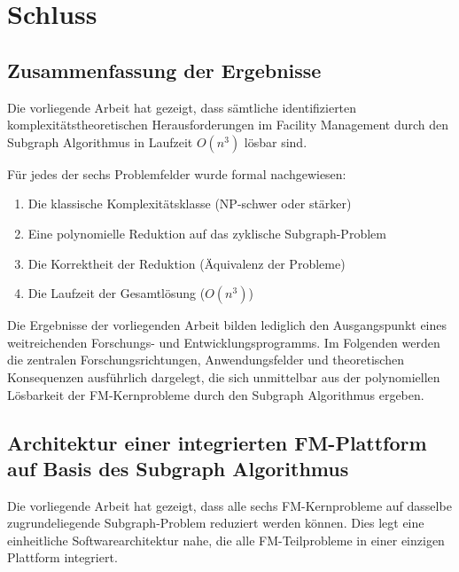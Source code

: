 ﻿\documentclass[a4paper,12pt]{article}
\theoremstyle{definition}
\begin{document}
\section{Schluss}
\label{sec:schluss}

\subsection{Zusammenfassung der Ergebnisse}

Die vorliegende Arbeit hat gezeigt, dass sämtliche identifizierten
komplexitätstheoretischen Herausforderungen im Facility Management durch
den Subgraph Algorithmus in Laufzeit $O(n^3)$ lösbar sind.

Für jedes der sechs Problemfelder wurde formal nachgewiesen:
\begin{enumerate}
    \item Die klassische Komplexitätsklasse (NP-schwer oder stärker)
    \item Eine polynomielle Reduktion auf das zyklische Subgraph-Problem
    \item Die Korrektheit der Reduktion (Äquivalenz der Probleme)
    \item Die Laufzeit der Gesamtlösung ($O(n^3)$)
\end{enumerate}

Die Ergebnisse der vorliegenden Arbeit bilden lediglich den Ausgangspunkt eines
weitreichenden Forschungs- und Entwicklungsprogramms. Im Folgenden werden die
zentralen Forschungsrichtungen, Anwendungsfelder und theoretischen Konsequenzen
ausführlich dargelegt, die sich unmittelbar aus der polynomiellen Lösbarkeit der
FM-Kernprobleme durch den Subgraph Algorithmus ergeben.

\subsection{Architektur einer integrierten FM-Plattform auf Basis des Subgraph Algorithmus}

Die vorliegende Arbeit hat gezeigt, dass alle sechs FM-Kernprobleme auf dasselbe
zugrundeliegende Subgraph-Problem reduziert werden können. Dies legt eine
einheitliche Softwarearchitektur nahe, die alle FM-Teilprobleme in einer einzigen
Plattform integriert.
\end{document}
